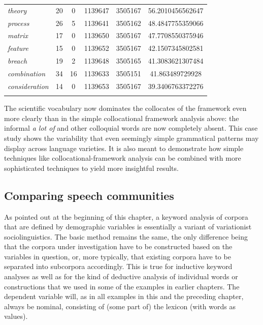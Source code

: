 \begin{table}
{\begin{tabular}[t]{l *{2}{S[table-format=3]} *{2}{S[table-format=7]} S[table-format=3.2]}
\textit{theory} & 20 & 0 & 1139647 & 3505167 & 56.2010456562647 \\
\textit{process} & 26 & 5 & 1139641 & 3505162 & 48.4847755359066 \\
\textit{matrix} & 17 & 0 & 1139650 & 3505167 & 47.7708550375946 \\
\textit{feature} & 15 & 0 & 1139652 & 3505167 & 42.1507345802581 \\
\textit{breach} & 19 & 2 & 1139648 & 3505165 & 41.3083621307484 \\
\textit{combination} & 34 & 16 & 1139633 & 3505151 & 41.863489729928 \\
\textit{consideration} & 14 & 0 & 1139653 & 3505167 & 39.3406763372276 \\
\lspbottomrule
{} \\ %
\end{tabular}}
\end{table}

The scientific vocabulary now dominates the collocates  of the framework even more clearly than in the simple collocational framework  analysis above: the informal \textit{a lot of} and other colloquial words are now completely absent. This case study shows the variability that even seemingly simple grammatical  patterns may display across language varieties.  It is also meant to demonstrate how simple techniques like collocational\hyp{}framework  analysis can be combined with more sophisticated techniques to yield more insightful results.

\subsection{Comparing speech communities}
\label{sec:comparingspeechcommunities}

As pointed out at the beginning of this chapter, a keyword  analysis of corpora that are defined by demographic  variables is essentially a variant of variationist  sociolinguistics.  The basic method remains the same, the only difference being that the corpora under investigation have to be constructed based on the variables in question, or, more typically, that existing corpora have to be separated into subcorpora accordingly. This is true for inductive  keyword analyses as well as for the kind of deductive  analysis of individual words or constructions that we used in some of the examples in earlier chapters. The dependent variable will, as in all examples in this and the preceding chapter, always be nominal,  consisting of (some part of) the lexicon  (with words as values).

